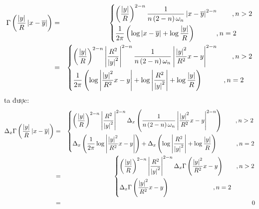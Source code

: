 \begin{eqnarray}
\Gamma \left( {\frac{{\left| y \right|}}
{R}\left| {x - \overline y } \right|} \right)&=& \left\{ \begin{gathered}
  \left( {\frac{{\left| y \right|}}
{R}} \right)^{2 - n} \frac{1}
{{n\left( {2 - n} \right)\omega _n }}\left| {x - \overline y } \right|^{2 - n} \quad \quad ,n > 2 \hfill \\
  \frac{1}
{{2\pi }}\left( {\log \left| {x - \overline y } \right| + \log \frac{{\left| y \right|}}
{R}} \right)\quad \quad \quad ,n = 2 \hfill \\ 
\end{gathered}  \right.\nonumber\\
 &= &\left\{ \begin{gathered}
  \left( {\frac{{\left| y \right|}}
{R}} \right)^{2 - n} \left| {\frac{{R^2 }}
{{\left| y \right|^2 }}} \right|^{2 - n} \frac{1}
{{n\left( {2 - n} \right)\omega _n }}\left| {\frac{{\left| y \right|^2 }}
{{R^2 }}x - y} \right|^{2 - n} \quad \quad ,n > 2 \hfill \\
  \frac{1}
{{2\pi }}\left( {\log \left| {\frac{{\left| y \right|^2 }}
{{R^2 }}x - y} \right| + \log \left| {\frac{{R^2 }}
{{\left| y \right|^2 }}} \right| + \log \frac{{\left| y \right|}}
{R}} \right)\quad \quad \quad ,n = 2 \hfill \\ 
\end{gathered}  \right.\nonumber
\end{eqnarray}
ta được:
\begin{eqnarray}
\Delta _x \Gamma \left( {\frac{{\left| y \right|}}
{R}\left| {x - \overline y } \right|} \right) &=& \left\{ \begin{gathered}
  \left( {\frac{{\left| y \right|}}
{R}} \right)^{2 - n} \left| {\frac{{R^2 }}
{{\left| y \right|^2 }}} \right|^{2 - n} \Delta _x \left( {\frac{1}
{{n\left( {2 - n} \right)\omega _n }}\left| {\frac{{\left| y \right|^2 }}
{{R^2 }}x - y} \right|^{2 - n} } \right)\quad \quad ,n > 2 \hfill \\
  \Delta _x \left( {\frac{1}
{{2\pi }}\log \left| {\frac{{\left| y \right|^2 }}
{{R^2 }}x - y} \right|} \right) + \Delta _x \left( {\log \left| {\frac{{R^2 }}
{{\left| y \right|^2 }}} \right| + \log \frac{{\left| y \right|}}
{R}} \right)\quad \quad \quad ,n = 2 \hfill \\ 
\end{gathered}  \right.\nonumber\\
& =& \left\{ \begin{gathered}
  \left( {\frac{{\left| y \right|}}
{R}} \right)^{2 - n} \left| {\frac{{R^2 }}
{{\left| y \right|^2 }}} \right|^{2 - n} \Delta _x \Gamma \left( {\frac{{\left| y \right|^2 }}
{{R^2 }}x - y} \right)\quad \quad ,n > 2 \hfill \\
  \Delta _x \Gamma \left( {\frac{{\left| y \right|^2 }}
{{R^2 }}x - y} \right)\quad \quad \quad \quad \quad \quad \quad ,n = 2 \hfill \\ 
\end{gathered}  \right.\nonumber\\
& = &0 \nonumber
\end{eqnarray}
